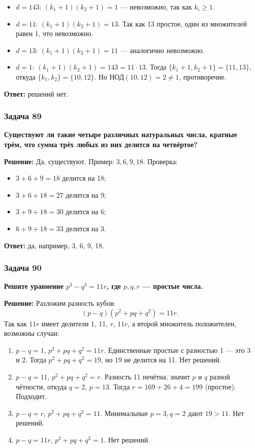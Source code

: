 \documentclass[12pt, a4paper]{article}
\begin{document}
\begin{itemize}
    \item $d=143$: $(k_1+1)(k_2+1) = 1$ — невозможно, так как $k_i \ge 1$.
    \item $d=11$: $(k_1+1)(k_2+1) = 13$. Так как 13 простое, один из множителей равен 1, что невозможно.
    \item $d=13$: $(k_1+1)(k_2+1) = 11$ — аналогично невозможно.
    \item $d=1$: $(k_1+1)(k_2+1) = 143 = 11 \cdot 13$. Тогда $\{k_1+1, k_2+1\} = \{11, 13\}$, откуда $\{k_1, k_2\} = \{10, 12\}$. Но $\text{НОД}(10, 12) = 2 \neq 1$, противоречие.
\end{itemize}

\textbf{Ответ:} решений нет.

\subsubsection*{Задача 89}
\textbf{Существуют ли такие четыре различных натуральных числа, кратные трём, что сумма трёх любых из них делится на четвёртое?}

\textbf{Решение:}
Да, существуют. Пример: $3, 6, 9, 18$. Проверка:
\begin{itemize}
    \item $3+6+9 = 18$ делится на 18;
    \item $3+6+18 = 27$ делится на 9;
    \item $3+9+18 = 30$ делится на 6;
    \item $6+9+18 = 33$ делится на 3.
\end{itemize}

\textbf{Ответ:} да, например, 3, 6, 9, 18.

\subsubsection*{Задача 90}
\textbf{Решите уравнение $p^3 - q^3 = 11r$, где $p, q, r$ — простые числа.}

\textbf{Решение:}
Разложим разность кубов:
\[
(p-q)(p^2 + pq + q^2) = 11r.
\]
Так как $11r$ имеет делители 1, 11, $r$, $11r$, а второй множитель положителен, возможны случаи:
\begin{enumerate}
    \item $p-q = 1$, $p^2+pq+q^2 = 11r$. Единственные простые с разностью 1 — это 3 и 2. Тогда $p^2+pq+q^2 = 19$, но 19 не делится на 11. Нет решений.
    \item $p-q = 11$, $p^2+pq+q^2 = r$. Разность 11 нечётна, значит $p$ и $q$ разной чётности, откуда $q=2$, $p=13$. Тогда $r = 169 + 26 + 4 = 199$ (простое). Подходит.
    \item $p-q = r$, $p^2+pq+q^2 = 11$. Минимальные $p=3, q=2$ дают $19 > 11$. Нет решений.
    \item $p-q = 11r$, $p^2+pq+q^2 = 1$. Нет решений.
\end{enumerate}
\end{document}
